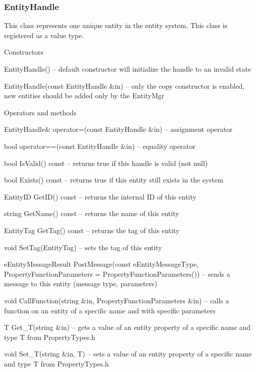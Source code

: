 \subsubsection{EntityHandle}

This class represents one unique entity in the entity system. This class is registered as a value type.

\begin{titled-itemize}{Constructors}
  \item EntityHandle() -- default constructor will initialize the handle to an invalid state
  \item EntityHandle(const EntityHandle \&in) -- only the copy constructor is enabled, new entities should be added only by the EntityMgr
\end{titled-itemize}

\begin{titled-itemize}{Operators and methods}
  \item EntityHandle\& operator=(const EntityHandle \&in) -- assignment operator
  \item bool operator==(const EntityHandle \&in) -- equality operator
  \item bool IsValid() const -- returns true if this handle is valid (not null)
  \item bool Exists() const -- returns true if this entity still exists in the system
  \item EntityID GetID() const -- returns the internal ID of this entity
  \item string GetName() const -- returns the name of this entity
  \item EntityTag GetTag() const -- returns the tag of this entity
  \item void SetTag(EntityTag) -- sets the tag of this entity
  \item eEntityMessageResult PostMessage(const eEntityMessageType, PropertyFunctionParameters = PropertyFunctionParameters()) -- sends a message to this entity (message type, parameters)
  \item void CallFunction(string \&in, PropertyFunctionParameters \&in) -- calls a function on an entity of a specific name and with specific parameters
  \item T Get\_T(string \&in) -- gets a value of an entity property of a specific name and type T from PropertyTypes.h
  \item void Set\_T(string \&in, T) -- sets a value of an entity property of a specific name and type T from PropertyTypes.h

\end{titled-itemize}
